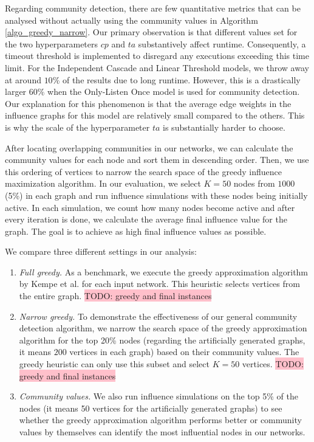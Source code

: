 \documentclass[pdflatex,sn-mathphys-num]{sn-jnl}
\begin{document}
Regarding community detection, there are few quantitative metrics that can be analysed without actually using the community values in Algorithm \ref{algo_greedy_narrow}. Our primary observation is that different values set for the two hyperparameters $cp$ and $ta$ substantively affect runtime. Consequently, a timeout threshold is implemented to disregard any executions exceeding this time limit. For the Independent Cascade and Linear Threshold models, we throw away at around $10\%$ of the results due to long runtime. However, this is a drastically larger $60\%$ when the Only-Listen Once model is used for community detection. Our explanation for this phenomenon is that the average edge weights in the influence graphs for this model are relatively small compared to the others. This is why the scale of the hyperparameter $ta$ is substantially harder to choose.

After locating overlapping communities in our networks, we can calculate the community values for each node and sort them in descending order. Then, we use this ordering of vertices to narrow the search space of the greedy influence maximization algorithm. In our evaluation, we select $K = 50$ nodes from $1000$ (5\%) in each graph and run influence simulations with these nodes being initially active. In each simulation, we count how many nodes become active and after every iteration is done, we calculate the average final influence value for the graph. The goal is to achieve as high final influence values as possible.

We compare three different settings in our analysis:

\begin{enumerate}

  \item \textit{Full greedy.} As a benchmark, we execute the greedy approximation algorithm by Kempe et al. for each input network. This heuristic selects vertices from the entire graph. \colorbox{pink}{TODO: greedy and final instances}

  \item \textit{Narrow greedy.} To demonstrate the effectiveness of our general community detection algorithm, we narrow the search space of the greedy approximation algorithm for the top 20\% nodes (regarding the artificially generated graphs, it means $200$ vertices in each graph) based on their community values. The greedy heuristic can only use this subset and select $K = 50$ vertices. \colorbox{pink}{TODO: greedy and final instances}

  \item \textit{Community values.} We also run influence simulations on the top 5\% of the nodes (it means 50 vertices for the artificially generated graphs) to see whether the greedy approximation algorithm performs better or community values by themselves can identify the most influential nodes in our networks.

\end{enumerate}
\end{document}
